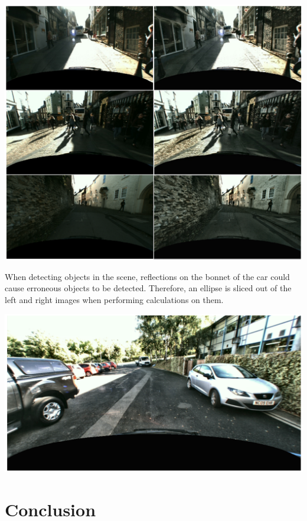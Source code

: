 \documentclass{article}
\begin{document}
	\begin{minipage}{1.0\linewidth}
		\begin{center}
			\includegraphics[width=0.76\linewidth]{"../_submission/clahe-before-and-after.png"}
		\end{center}
	\end{minipage}
	
	When detecting objects in the scene, reflections on the bonnet of the car could cause erroneous objects to be detected. Therefore, an ellipse is sliced out of the left and right images when performing calculations on them.
	
	\begin{minipage}{1.0\linewidth}
		\begin{center}
			\includegraphics[width=0.76\linewidth]{"../_submission/bonnet-mask.png"}
		\end{center}
	\end{minipage}

	\section{Conclusion}
	
\end{document}

